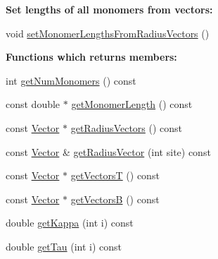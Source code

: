 \begin{Indent}{\bf Set lengths of all monomers from vectors\+:}\par
\begin{DoxyCompactItemize}
\item 
void \hyperlink{class_p_c_a_1_1_polymer_a2dae638afa952c286c16122c7ab52b6e}{set\+Monomer\+Lengths\+From\+Radius\+Vectors} ()
\end{DoxyCompactItemize}
\end{Indent}
\begin{Indent}{\bf Functions which returns members\+:}\par
\begin{DoxyCompactItemize}
\item 
int \hyperlink{class_p_c_a_1_1_polymer_a5c87b083f77c06ffd14278f87dad47ea}{get\+Num\+Monomers} () const
\item 
const double $\ast$ \hyperlink{class_p_c_a_1_1_polymer_af05e598bcd1e9987aca46d0661ac6dca}{get\+Monomer\+Length} () const
\item 
const \hyperlink{class_p_c_a_1_1_vector}{Vector} $\ast$ \hyperlink{class_p_c_a_1_1_polymer_a6e913f9b50a164c828f9a3cb89e452e1}{get\+Radius\+Vectors} () const
\item 
const \hyperlink{class_p_c_a_1_1_vector}{Vector} \& \hyperlink{class_p_c_a_1_1_polymer_ab2ea86763e0f0be646ef6aa6a105f927}{get\+Radius\+Vector} (int site) const
\item 
const \hyperlink{class_p_c_a_1_1_vector}{Vector} $\ast$ \hyperlink{class_p_c_a_1_1_polymer_a83c92fb07eafc88d121ef4b4124319c3}{get\+VectorsT} () const
\item 
const \hyperlink{class_p_c_a_1_1_vector}{Vector} $\ast$ \hyperlink{class_p_c_a_1_1_polymer_a4a90f901ceb688b0d96b126cc2ba3678}{get\+VectorsB} () const
\item 
double \hyperlink{class_p_c_a_1_1_polymer_ac0cafb89b662aaa3be2bbc7bf034d410}{get\+Kappa} (int i) const
\item 
double \hyperlink{class_p_c_a_1_1_polymer_a01b636d898a08113ca9bf556447934ec}{get\+Tau} (int i) const
\end{DoxyCompactItemize}
\end{Indent}
